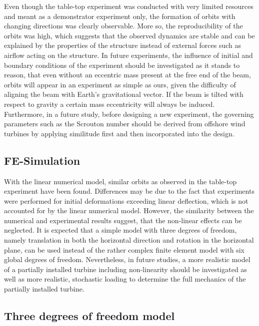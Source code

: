 \documentclass{article}
\begin{document}
Even though the table-top experiment was conducted with very limited resources and meant as a demonstrator experiment only, the formation of orbits with changing directions was clearly observable. More so, the reproducibility of the orbits was high, which suggests that the observed dynamics are stable and can be explained by the properties of the structure instead of external forces such as airflow acting on the structure. In future experiments, the influence of initial and boundary conditions of the experiment should be investigated as it stands to reason, that even without an eccentric mass present at the free end of the beam, orbits will appear in an experiment as simple as ours, given the difficulty of aligning the beam with Earth's gravitational vector. If the beam is tilted with respect to gravity a certain mass eccentricity will always be induced. Furthermore, in a future study, before designing a new experiment, the governing parameters such as the Scrouton number should be derived from offshore wind turbines by applying similitude first and then incorporated into the design. 

\subsection{FE-Simulation}

With the linear numerical model, similar orbits as observed in the table-top experiment have been found. Differences may be due to the fact that experiments were performed for initial deformations exceeding linear deflection, which is not accounted for by the linear numerical model. However, the similarity between the numerical and experimental results suggest, that the non-linear effects can be neglected. It is expected that a simple model with three degrees of freedom, namely translation in both the horizontal direction and rotation in the horizontal plane, can be used instead of the rather complex finite element model with six global degrees of freedom. Nevertheless, in future studies, a more realistic model of a partially installed turbine including non-linearity should be investigated as well as more realistic, stochastic loading to determine the full mechanics of the partially installed turbine.

\subsection{Three degrees of freedom model}
\end{document}

